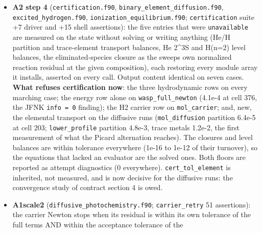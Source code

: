 \documentclass[english,a4paper]{my_memo}
\begin{document}
\begin{itemize}
  sits at the OUTER free-outflow cell: 0.75 of its own weight at every N
  under PLM (the zero-gradient ghost zeroes the MC forward difference, so
  cell N carries no pressure gradient), 6.4e-2 falling at order 1.4 under
  WENO3. A well-balanced pair (B4-5b) would not remove the drain; the outer
  boundary fill is the item (B4-4a, started). Two latent defects found:
  \texttt{define\_grid}\textquotesingle s \texttt{tol\ =\ 1.0} initializer implied SAVE, so a second call in
  one process skipped the stretch-factor Newton (production calls it once;
  fixed by the advisor: \texttt{tol} reset before the loop); the case README\textquotesingle s
  single \texttt{Grid\ cells} ladder does not refine the base cell (README updated).
\item
  \textbf{A2 step 4} (\texttt{certification.f90}, \texttt{binary\_element\_diffusion.f90},
  \texttt{excited\_hydrogen.f90}, \texttt{ionization\_equilibrium.f90}; \texttt{certification}
  suite +7 driver and +15 shell assertions): the five entries that were
  \texttt{unavailable} are measured on the state without solving or writing
  anything (He/H partition and trace-element transport balances, He 2\^{}3S and
  H(n=2) level balances, the eliminated-species closure as the sweep\textquotesingle s own
  normalized reaction residual at the given composition), each restoring
  every module array it installs, asserted on every call. Output content
  identical on seven cases. \textbf{What refuses certification now}: the three
  hydrodynamic rows on every marching case; the energy row alone on
  \texttt{wasp\_full\_newton} (4.1e-4 at cell 376, the JFNK \texttt{info\ =\ 0} finding); the
  H2 carrier row on \texttt{mol\_carrier}; and, new, the elemental transport on the
  diffusive runs (\texttt{mol\_diffusion} partition 6.4e-5 at cell 203;
  \texttt{lower\_profile} partition 4.8e-3, trace metals 1.2e-2, the first
  measurement of what the Picard alternation reaches). The closures and
  level balances are within tolerance everywhere (1e-16 to 1e-12 of their
  turnover), so the equations that lacked an evaluator are the solved ones.
  Both floors are reported as attempt diagnostics (0 everywhere).
  \texttt{cert\_tol\_element} is inherited, not measured, and is now decisive for the
  diffusive runs: the convergence study of contract section 4 is owed.
\item
  \textbf{A1scale2} (\texttt{diffusive\_photochemistry.f90}; \texttt{carrier\_retry} 51
  assertions): the carrier Newton stops when its residual is within its own
  tolerance of the full terms AND within the acceptance tolerance of the

\end{itemize}
\end{document}
